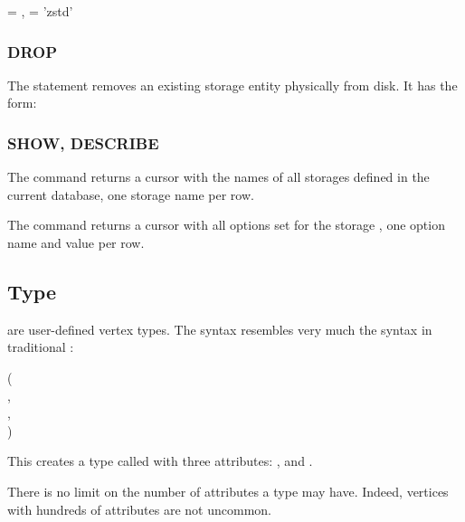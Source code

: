  
  = ,
               = 'zstd'

\subsubsection{DROP}
The  statement removes
an existing storage entity
physically from disk.
It has the form:

 


\subsubsection{SHOW, DESCRIBE}
The command 
returns a cursor with the names of all
storages defined in the current database,
one storage name per row.

The command  
returns a cursor with all options set for the storage
, one option name and value
per row.

\subsection{Type}
 are user-defined vertex types.
The syntax resembles very much
the  syntax
in traditional \sql:

\begin{minipage}{\textwidth}
  ( \\
\hspace*{1cm}  , \\
\hspace*{1cm} , \\
\hspace*{1cm} )
\end{minipage}

This creates a type called 
with three attributes:
,  and .

There is no limit on the number of attributes
a type may have. Indeed, vertices with hundreds
of attributes are not uncommon.

